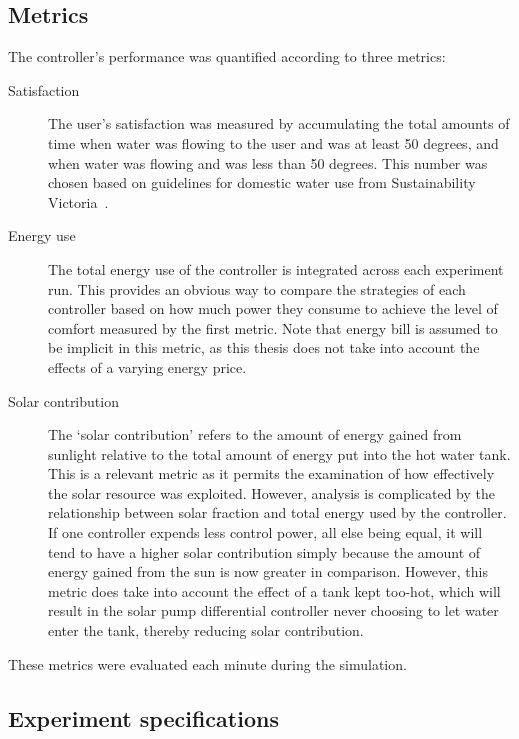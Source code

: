 \subsection{Metrics}

The controller's performance was quantified according to three metrics:

\begin{description}
   \item[Satisfaction]
      The user's satisfaction was measured by accumulating the total amounts of time when water was flowing to the user and was at least 50 degrees, and when water was flowing and was less than 50 degrees.
      This number was chosen based on guidelines for domestic water use from Sustainability Victoria~\cite{LSTS}.

   \item[Energy use]
      The total energy use of the controller is integrated across each experiment run.
      This provides an obvious way to compare the strategies of each controller based on how much power they consume to achieve the level of comfort measured by the first metric.
      Note that energy bill is assumed to be implicit in this metric, as this thesis does not take into account the effects of a varying energy price.

   \item[Solar contribution]
      The `solar contribution' refers to the amount of energy gained from sunlight relative to the total amount of energy put into the hot water tank.
      This is a relevant metric as it permits the examination of how effectively the solar resource was exploited.
      However, analysis is complicated by the relationship between solar fraction and total energy used by the controller.
      If one controller expends less control power, all else being equal, it will tend to have a higher solar contribution simply because the amount of energy gained from the sun is now greater in comparison.
      However, this metric does take into account the effect of a tank kept too-hot, which will result in the solar pump differential controller never choosing to let water enter the tank, thereby reducing solar contribution.
\end{description}

These metrics were evaluated each minute during the simulation.

\subsection{Experiment specifications}


